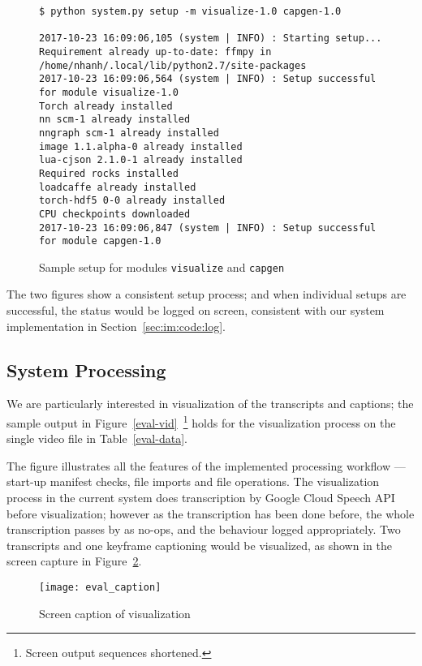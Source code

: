 \begin{figure}[ht]
\begin{lstlisting}
$ python system.py setup -m visualize-1.0 capgen-1.0

2017-10-23 16:09:06,105 (system | INFO) : Starting setup...
Requirement already up-to-date: ffmpy in /home/nhanh/.local/lib/python2.7/site-packages
2017-10-23 16:09:06,564 (system | INFO) : Setup successful for module visualize-1.0
Torch already installed
nn scm-1 already installed
nngraph scm-1 already installed
image 1.1.alpha-0 already installed
lua-cjson 2.1.0-1 already installed
Required rocks installed
loadcaffe already installed
torch-hdf5 0-0 already installed
CPU checkpoints downloaded
2017-10-23 16:09:06,847 (system | INFO) : Setup successful for module capgen-1.0
\end{lstlisting}
\caption{Sample setup for modules \texttt{visualize} and
\texttt{capgen}}\label{eval-2mod}
\end{figure}

The two figures show a consistent setup process; and when individual setups are
successful, the status would be logged on screen, consistent with our system
implementation in Section~\ref{sec:im:code:log}.

\subsection{System Processing}

We are particularly interested in visualization of the transcripts and captions;
the sample output in Figure~\ref{eval-vid}~\footnote{Screen output sequences
shortened.} holds for the visualization process on the single video file in
Table~\ref{eval-data}.

The figure illustrates all the features of the implemented processing workflow
--- start-up manifest checks, file imports and file operations. The visualization
process in the current system does transcription by Google Cloud Speech API
before visualization; however as the transcription has been done before, the
whole transcription passes by as no-ops, and the behaviour logged appropriately.
Two transcripts and one keyframe captioning would be visualized, as shown in the
screen capture in Figure~\ref{eval-cap}.

\begin{figure}[ht]
\begin{center}
    \texttt{[image: eval\_caption]}
    \caption{Screen caption of visualization}\label{eval-cap}
\end{center}
\end{figure}

